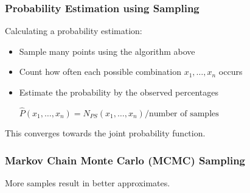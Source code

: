 \documentclass[
../EiKI_Summary.tex,
]
{subfiles}
\begin{document}
\subsubsection*{Probability Estimation using Sampling}
Calculating a probability estimation:
\begin{itemize}
    \item Sample many points using the algorithm above
    \item Count how often each possible combination $x_1, \ldots, x_n$ occurs
    \item Estimate the probability by the observed percentages \\
    \begin{smallmathbox*}
        $\hat{P}(x_1, \ldots, x_n) = N_{PS}(x_1, \ldots, x_n) / \text{number of samples}$
    \end{smallmathbox*}
\end{itemize}

This converges towards the joint probability function.

\subsubsection*{Markov Chain Monte Carlo (MCMC) Sampling}
\begin{codebox*}
    \begin{algorithm}[H]

    \end{algorithm}
\end{codebox*}

More samples result in better approximates.
\end{document}
